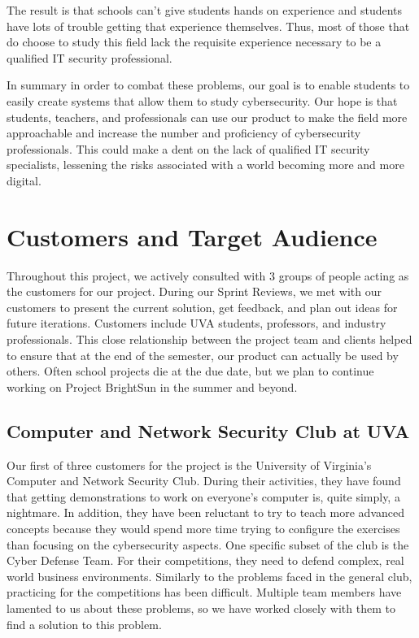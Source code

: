 \documentclass[openright]{report}
\begin{document}
\par The result is that schools can't give students hands on experience and students have lots of trouble getting that experience themselves. Thus, most of those that do choose to study this field lack the requisite experience necessary to be a qualified IT security professional.

\par In summary in order to combat these problems, our goal is to enable students to easily create systems that allow them to study cybersecurity. Our hope is that students, teachers, and professionals can use our product to make the field more approachable and increase the number and proficiency of cybersecurity professionals. This could make a dent on the lack of qualified IT security specialists, lessening the risks associated with a world becoming more and more digital.

\section{Customers and Target Audience}

\par Throughout this project, we actively consulted with 3 groups of people acting as the customers for our project. During our Sprint Reviews, we met with our customers to present the current solution, get feedback, and plan out ideas for future iterations. Customers include UVA students, professors, and industry professionals. This close relationship between the project team and clients helped to ensure that at the end of the semester, our product can actually be used by others. Often school projects die at the due date, but we plan to continue working on Project BrightSun in the summer and beyond.

\subsection{Computer and Network Security Club at UVA}

\par Our first of three customers for the project is the University of Virginia's Computer and Network Security Club. During their activities, they have found that getting demonstrations to work on everyone's computer is, quite simply, a nightmare. In addition, they have been reluctant to try to teach more advanced concepts because they would spend more time trying to configure the exercises than focusing on the cybersecurity aspects. One specific subset of the club is the Cyber Defense Team. For their competitions, they need to defend complex, real world business environments. Similarly to the problems faced in the general club, practicing for the competitions has been difficult. Multiple team members have lamented to us about these problems, so we have worked closely with them to find a solution to this problem.
\end{document}
